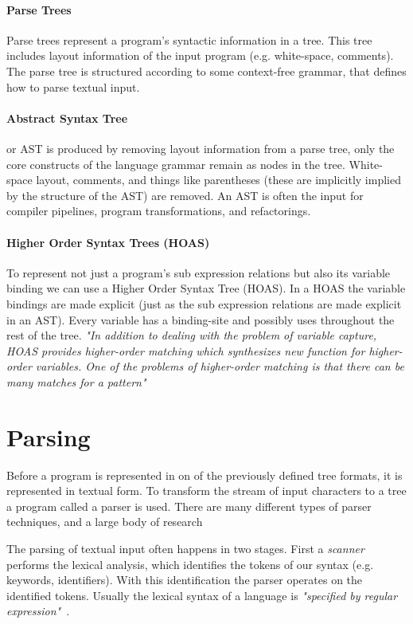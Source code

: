 \paragraph{Parse Trees}
Parse trees represent a program's syntactic information in a tree. This tree includes layout information of the input program (e.g. white-space, comments). The parse tree is structured according to some context-free grammar, that defines how to parse textual input.

\paragraph{Abstract Syntax Tree}
or AST is produced by removing layout information from a parse tree, only the core constructs of the language grammar remain as nodes in the tree. White-space layout, comments, and things like parentheses (these are implicitly implied by the structure of the AST) are removed. An AST is often the input for compiler pipelines, program transformations, and refactorings.

\paragraph{Higher Order Syntax Trees (HOAS)}
To represent not just a program's sub expression relations but also its variable binding we can use a Higher Order Syntax Tree (HOAS)\cite{Pfenning1988}. In a HOAS the variable bindings are made explicit (just as the sub expression relations are made explicit in an AST). Every variable has a binding-site and possibly uses throughout the rest of the tree. \textit{"In addition to dealing with the problem of variable capture, HOAS provides higher-order matching which synthesizes new function for higher-order  variables. One of the problems of higher-order matching is that there can be many matches for a pattern"}~\cite{Visser2001}

\section{Parsing} \label{parsing}
Before a program is represented in on of the previously defined tree formats, it is represented in textual form. To transform the stream of input characters to a tree a program called a parser is used. There are many different types of parser techniques, and a large body of research~\cite{Visser1997,VandenBrand2002,Salomon1989}

The parsing of textual input often happens in two stages. First a \textit{scanner} performs the lexical analysis, which identifies the tokens of our syntax (e.g. keywords, identifiers). With this identification the parser operates on the identified tokens. Usually the lexical syntax of a language is \textit{"specified by regular expression"}~\cite{Bravenboer2004}.

